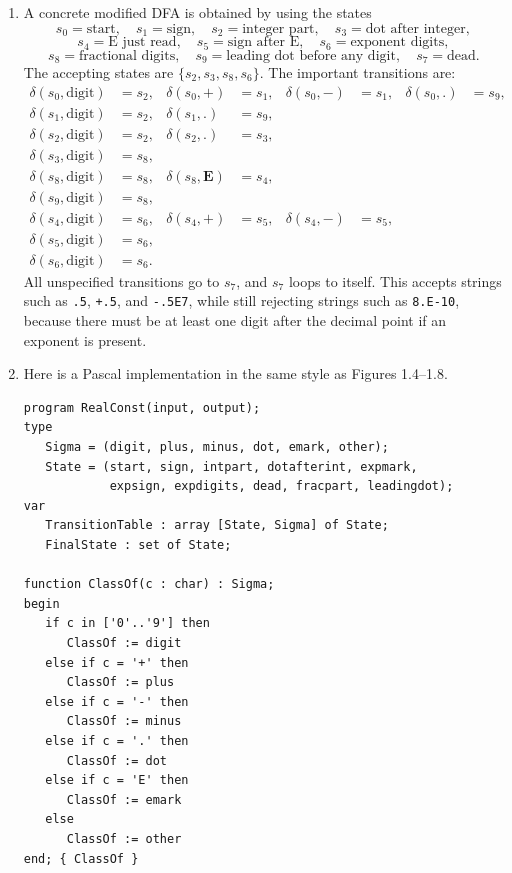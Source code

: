 \documentclass[11pt,openany]{book}
\begin{document}
\begin{enumerate}[{1.}1.]
\begin{enumerate}
\item A concrete modified DFA is obtained by using the states
\[
s_0=\text{start},\quad s_1=\text{sign},\quad s_2=\text{integer part},\quad s_3=\text{dot after integer},
\]
\[
s_4=\text{E just read},\quad s_5=\text{sign after E},\quad s_6=\text{exponent digits},
\]
\[
s_8=\text{fractional digits},\quad s_9=\text{leading dot before any digit},\quad s_7=\text{dead}.
\]
The accepting states are $\{s_2,s_3,s_8,s_6\}$. The important transitions are:
\begin{align*}
\delta(s_0,\text{digit})&=s_2, & \delta(s_0,\pmb{+})&=s_1, & \delta(s_0,\pmb{-})&=s_1, & \delta(s_0,\pmb{.})&=s_9,\\
\delta(s_1,\text{digit})&=s_2, & \delta(s_1,\pmb{.})&=s_9,\\
\delta(s_2,\text{digit})&=s_2, & \delta(s_2,\pmb{.})&=s_3,\\
\delta(s_3,\text{digit})&=s_8,\\
\delta(s_8,\text{digit})&=s_8, & \delta(s_8,\pmb{E})&=s_4,\\
\delta(s_9,\text{digit})&=s_8,\\
\delta(s_4,\text{digit})&=s_6, & \delta(s_4,\pmb{+})&=s_5, & \delta(s_4,\pmb{-})&=s_5,\\
\delta(s_5,\text{digit})&=s_6,\\
\delta(s_6,\text{digit})&=s_6.
\end{align*}
All unspecified transitions go to $s_7$, and $s_7$ loops to itself. This accepts strings such as \texttt{.5}, \texttt{+.5}, and \texttt{-.5E7}, while still rejecting strings such as \texttt{8.E-10}, because there must be at least one digit after the decimal point if an exponent is present.

\item Here is a Pascal implementation in the same style as Figures 1.4--1.8.

\begin{verbatim}
program RealConst(input, output);
type
   Sigma = (digit, plus, minus, dot, emark, other);
   State = (start, sign, intpart, dotafterint, expmark,
            expsign, expdigits, dead, fracpart, leadingdot);
var
   TransitionTable : array [State, Sigma] of State;
   FinalState : set of State;

function ClassOf(c : char) : Sigma;
begin
   if c in ['0'..'9'] then
      ClassOf := digit
   else if c = '+' then
      ClassOf := plus
   else if c = '-' then
      ClassOf := minus
   else if c = '.' then
      ClassOf := dot
   else if c = 'E' then
      ClassOf := emark
   else
      ClassOf := other
end; { ClassOf }


\end{verbatim}
\end{enumerate}
\end{enumerate}
\end{document}
